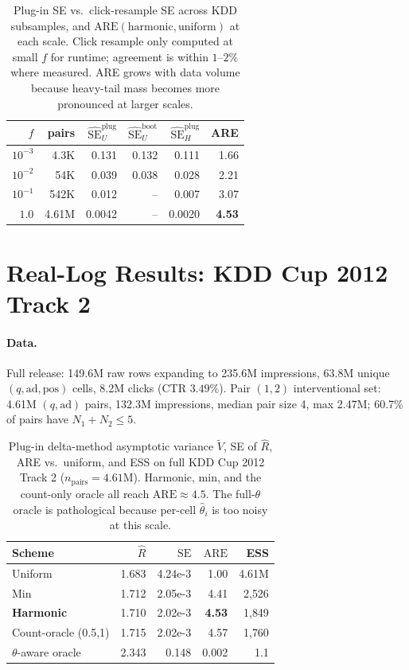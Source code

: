 \documentclass[sigconf]{acmart}
\begin{document}
\begin{table}[t]
\caption{Plug-in SE vs.\ click-resample SE across KDD subsamples, and
$\mathrm{ARE}(\text{harmonic},\text{uniform})$ at each scale. Click
resample only computed at small $f$ for runtime; agreement is within
$1$--$2\%$ where measured. ARE grows with data volume because
heavy-tail mass becomes more pronounced at larger scales.}
\label{tab:scaling}
\centering
\small
\begin{tabular}{rrrrrr}
\toprule
$f$ & pairs & $\widehat{\mathrm{SE}}_U^{\mathrm{plug}}$ & $\widehat{\mathrm{SE}}_U^{\mathrm{boot}}$
& $\widehat{\mathrm{SE}}_H^{\mathrm{plug}}$ & ARE \\
\midrule
$10^{-3}$ & 4.3K  & 0.131 & 0.132 & 0.111 & 1.66 \\
$10^{-2}$ & 54K   & 0.039 & 0.038 & 0.028 & 2.21 \\
$10^{-1}$ & 542K  & 0.012 & --    & 0.007 & 3.07 \\
$1.0$     & 4.61M & 0.0042 & --   & 0.0020 & \textbf{4.53} \\
\bottomrule
\end{tabular}
\end{table}

\section{Real-Log Results: KDD Cup 2012 Track 2}
\label{sec:kdd}

\paragraph{Data.} Full release: 149.6M raw rows expanding to 235.6M
impressions, 63.8M unique $(q,\mathrm{ad},\mathrm{pos})$ cells, 8.2M clicks
(CTR $3.49\%$). Pair $(1,2)$ interventional set: 4.61M $(q,\mathrm{ad})$
pairs, 132.3M impressions, median pair size 4, max 2.47M; 60.7\% of pairs
have $N_1+N_2\le 5$.

\begin{table}[t]
\caption{Plug-in delta-method asymptotic variance $\widetilde V$, SE of
$\hat R$, ARE vs.\ uniform, and ESS on full KDD Cup 2012 Track 2
($n_{\mathrm{pairs}}=4.61$M). Harmonic, min, and the count-only oracle
all reach $\mathrm{ARE}\approx 4.5$. The full-$\theta$ oracle is
pathological because per-cell $\hat\theta_i$ is too noisy at this scale.}
\label{tab:are_full}
\centering
\small
\begin{tabular}{lrrrr}
\toprule
Scheme                     & $\hat R$ & $\mathrm{SE}$ & $\mathrm{ARE}$ & ESS \\
\midrule
Uniform                    & 1.683 & 4.24e-3 & 1.00          & 4.61M \\
Min                        & 1.712 & 2.05e-3 & 4.41          & 2{,}526 \\
\textbf{Harmonic}          & 1.710 & 2.02e-3 & \textbf{4.53} & 1{,}849 \\
Count-oracle (0.5,1)       & 1.715 & 2.02e-3 & 4.57          & 1{,}760 \\
$\theta$-aware oracle      & 2.343 & 0.148   & 0.002         & 1.1 \\
\bottomrule
\end{tabular}
\end{table}
\end{document}

